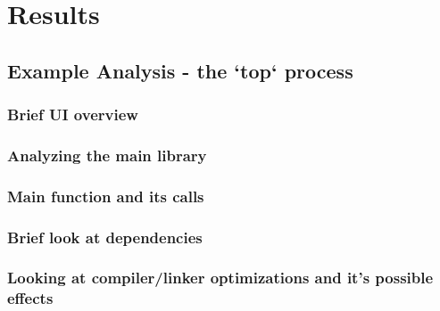 \chapter{Results}
\label{cha:results}

\section{Example Analysis - the `top` process}

\subsection{Brief UI overview}

\subsection{Analyzing the main library}

\subsection{Main function and its calls}

\subsection{Brief look at dependencies}

\subsection{Looking at compiler/linker optimizations and it's possible effects}